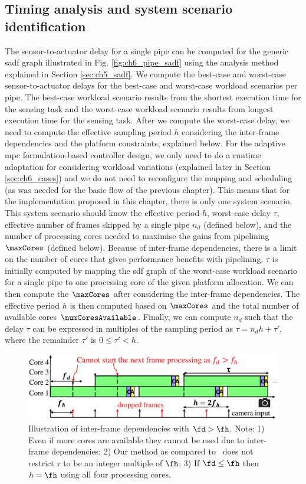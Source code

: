 \subsection{Timing analysis and system scenario identification}
The sensor-to-actuator delay for a single pipe can be computed for the generic \gls{sadf} graph illustrated in Fig. \ref{fig:ch6_pipe_sadf} using the analysis method explained in Section \ref{sec:ch5_sadf}.
We compute the best-case and worst-case sensor-to-actuator delays for the best-case and worst-case workload scenarios per pipe. The best-case workload scenario results from the shortest execution time for the sensing task and the worst-case workload scenario results from longest execution time for the sensing task.
After we compute the worst-case delay, we need to compute the effective sampling period $h$ considering the inter-frame dependencies and the platform constraints, explained below.
For the adaptive \gls{mpc} formulation-based controller design, we only need to do a runtime adaptation for considering workload variations (explained later in Section \ref{sec:ch6_cases}) and we do not need to reconfigure the mapping and scheduling (as was needed for the basic flow of the previous chapter).
This means that for the implementation proposed in this chapter, there is only one system scenario. This system scenario should know the effective period $h$, worst-case delay $\tau$, effective number of frames skipped by a single pipe $n_d$ (defined below), and the number of processing cores needed to maximise the gains from pipelining $\maxCores$ (defined below). Because of inter-frame dependencies, there is a limit on the number of cores that gives performance benefits with pipelining. 
$\tau$ is initially computed by mapping the \gls{sdf} graph of the worst-case workload scenario for a single pipe to one processing core of the given platform allocation. We can then compute the $\maxCores$ after considering the inter-frame dependencies. The effective period $h$ is then computed based on $\maxCores$ and the total number of available cores $\numCoresAvailable$. Finally, we can compute $n_d$ such that the delay $\tau$ can be expressed in multiples of the sampling period as $\tau = n_{d}h+\tau'$, where the remainder $\tau'$ is $0\leq \tau' <h$. 

\begin{figure}[t]
\centerline{
    \includegraphics[width=\textwidth]{images/ifd.eps}
    }
    \caption{Illustration of inter-frame dependencies with $\fd>\fh$. Note: 1) Even if more cores are available they cannot be used due to inter-frame dependencies; 2) Our method as compared to~\cite{medina2019designing} does not restrict $\tau$ to be an integer multiple of $\fh$; 3) If $\fd\le \fh$ then $h=\fh$ using all four processing cores.}
    \label{fig:ch6_ifd}
    \vspace{-1em}
\end{figure}
